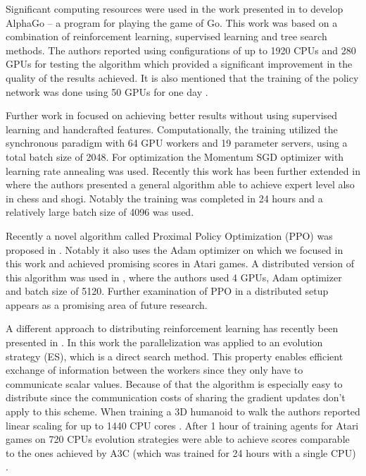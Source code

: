 \documentclass{llncs}
\begin{document}
Significant computing resources were used in the work presented in \cite{deepmind_alpha_go_nature_2016} to develop AlphaGo -- a program for playing the game of Go. This work was based on a combination of reinforcement learning, supervised learning and tree search methods. The authors reported using configurations of up to 1920 CPUs and 280 GPUs for testing the algorithm which provided a significant improvement in the quality of the results achieved. It is also mentioned that the training of the policy network was done using 50 GPUs for one day \cite{deepmind_alpha_go_nature_2016}.

Further work in \cite{deepmind_alpha_go_zero} focused on achieving better results without using supervised learning and handcrafted features. Computationally, the training utilized the synchronous paradigm with 64 GPU workers and 19 parameter servers, using a total batch size of 2048. For optimization the Momentum SGD optimizer with learning rate annealing was used. Recently this work has been further extended in \cite{deepmind_alpha_zero} where the authors presented a general algorithm able to achieve expert level also in chess and shogi. Notably the training was completed in 24 hours and a relatively large batch size of 4096 was used.

Recently a novel algorithm called Proximal Policy Optimization (PPO) was proposed in \cite{ppo}. Notably it also uses the Adam optimizer on which we focused in this work and achieved promising scores in Atari games. A distributed version of this algorithm was used in \cite{openai_sumo}, where the authors used 4 GPUs, Adam optimizer and batch size of 5120. Further examination of PPO in a distributed setup appears as a promising area of future research.

A different approach to distributing reinforcement learning has recently been presented in \cite{es_paper}. In this work the parallelization was applied to an evolution strategy (ES), which is a direct search method. This property enables efficient exchange of information between the workers since they only have to communicate scalar values. Because of that the algorithm is especially easy to distribute since the communication costs of sharing the gradient updates don't apply to this scheme. When training a 3D humanoid to walk the authors reported linear scaling for up to 1440 CPU cores \cite[p.~8]{es_paper}. After 1 hour of training agents for Atari games on 720 CPUs evolution strategies were able to achieve scores comparable to the ones achieved by A3C (which was trained for 24 hours with a single CPU) \cite[p.~7]{es_paper}.
\end{document}
